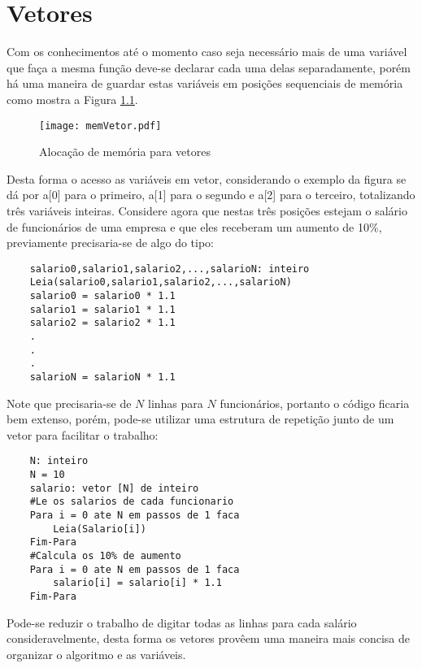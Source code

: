 \chapter{Vetores}
Com os conhecimentos até o momento caso seja necessário mais de uma variável que faça a mesma função deve-se declarar cada uma delas separadamente, porém há uma maneira de guardar estas variáveis em posições sequenciais de memória como mostra a Figura \ref{fig:memVetor}.
\begin{figure}[!h]
    \centering
    \texttt{[image: memVetor.pdf]}
    \caption{Alocação de memória para vetores}
    \label{fig:memVetor}
\end{figure}
Desta forma o acesso as variáveis em vetor, considerando o exemplo da figura se dá por a[0] para o primeiro, a[1] para o segundo e a[2] para o terceiro, totalizando três variáveis inteiras. Considere agora que nestas três posições estejam o salário de funcionários de uma empresa e que eles receberam um aumento de 10\%, previamente precisaria-se de algo do tipo:
\begin{lstlisting}
    salario0,salario1,salario2,...,salarioN: inteiro
    Leia(salario0,salario1,salario2,...,salarioN)
    salario0 = salario0 * 1.1
    salario1 = salario1 * 1.1
    salario2 = salario2 * 1.1
    .
    .
    .
    salarioN = salarioN * 1.1
\end{lstlisting}
Note que precisaria-se de $N$ linhas para $N$ funcionários, portanto o código ficaria bem extenso, porém, pode-se utilizar uma estrutura de repetição junto de um vetor para facilitar o trabalho:
\begin{lstlisting}
    N: inteiro
    N = 10
    salario: vetor [N] de inteiro
    #Le os salarios de cada funcionario
    Para i = 0 ate N em passos de 1 faca
        Leia(Salario[i])
    Fim-Para
    #Calcula os 10% de aumento
    Para i = 0 ate N em passos de 1 faca
        salario[i] = salario[i] * 1.1
    Fim-Para
\end{lstlisting}
Pode-se reduzir o trabalho de digitar todas as linhas para cada salário consideravelmente, desta forma os vetores provêem uma maneira mais concisa de organizar o algoritmo e as variáveis.